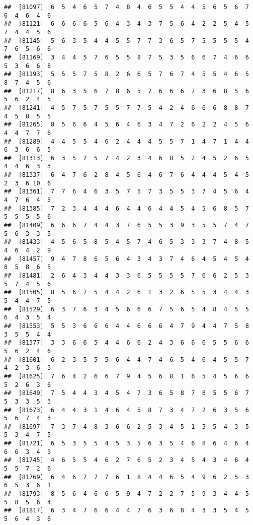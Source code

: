 \documentclass[
]{book}
\begin{document}
\begin{verbatim}
##  [81097]  6  5  4  6  5  7  4  8  4  6  5  5  4  4  5  6  5  6  7  6  4  6  4  6
##  [81121]  6  6  6  6  5  6  4  3  4  3  7  5  6  4  2  2  5  4  5  7  4  4  5  6
##  [81145]  5  6  3  5  4  4  5  5  7  7  3  6  5  7  5  5  5  5  4  7  6  5  6  6
##  [81169]  3  4  4  5  7  6  5  5  8  7  5  3  5  6  6  7  4  6  6  5  3  6  6  8
##  [81193]  5  5  5  7  5  8  2  6  6  5  7  6  7  4  5  5  4  6  5  8  7  4  5  6
##  [81217]  8  6  3  5  6  7  8  6  5  7  6  6  6  7  3  6  8  5  6  5  6  2  4  5
##  [81241]  4  5  7  5  7  5  5  7  7  5  4  2  4  6  6  6  8  8  7  4  5  8  5  5
##  [81265]  8  5  6  6  4  5  6  4  6  3  4  7  2  6  2  2  4  5  6  4  4  7  7  6
##  [81289]  4  4  5  5  4  6  2  4  4  4  5  5  7  1  4  7  1  4  4  6  3  6  6  5
##  [81313]  6  3  5  2  5  7  4  2  3  4  6  8  5  2  4  5  2  6  5  4  4  6  3  3
##  [81337]  6  4  7  6  2  8  4  5  6  4  6  7  6  4  4  4  5  4  5  2  3  6 10  6
##  [81361]  7  7  6  4  6  3  5  7  5  7  3  5  5  3  7  4  5  6  4  4  7  6  4  5
##  [81385]  7  2  3  4  4  4  6  4  4  6  4  4  5  4  5  6  8  5  7  5  5  5  5  6
##  [81409]  6  6  6  7  4  4  3  7  6  5  5  3  9  3  5  5  7  4  7  5  6  3  3  5
##  [81433]  4  5  6  5  8  5  4  5  7  4  6  5  3  3  3  7  4  8  5  4  6  4  2  9
##  [81457]  9  4  7  8  6  5  6  4  3  4  3  7  4  6  4  5  4  5  4  8  5  8  6  5
##  [81481]  2  6  4  3  4  4  3  3  6  5  5  5  5  7  6  6  2  5  3  5  7  4  5  6
##  [81505]  8  5  6  7  5  4  4  2  6  1  3  2  6  5  5  3  4  4  3  5  4  4  7  5
##  [81529]  6  3  7  6  3  4  5  6  6  6  7  5  6  5  4  8  4  5  5  6  4  3  5  4
##  [81553]  5  5  3  6  6  6  4  4  6  6  6  4  7  9  4  4  7  5  8  3  5  5  4  4
##  [81577]  3  3  6  6  5  4  4  6  6  2  4  3  6  6  6  5  5  6  6  5  6  2  4  6
##  [81601]  6  2  3  5  5  5  6  4  4  7  4  6  5  4  6  4  5  5  7  4  2  3  6  3
##  [81625]  7  6  4  2  6  6  7  9  4  5  6  8  1  6  5  4  5  6  6  5  2  6  3  6
##  [81649]  7  5  4  4  3  4  5  4  7  3  6  5  8  7  8  5  5  6  7  5  3  3  5  3
##  [81673]  6  4  4  3  1  4  6  4  5  8  7  3  4  7  2  6  3  5  6  5  6  7  4  3
##  [81697]  7  3  7  4  8  3  6  6  2  5  3  4  5  1  5  5  4  3  5  5  3  4  7  5
##  [81721]  6  5  3  5  5  4  5  3  5  6  3  5  4  6  8  6  4  6  4  6  6  3  4  3
##  [81745]  4  6  5  5  4  6  2  7  6  5  2  3  4  5  4  3  4  6  4  5  5  7  2  6
##  [81769]  6  4  6  7  7  7  6  1  8  4  4  6  5  4  9  6  2  5  3  6  5  3  6  1
##  [81793]  8  5  6  4  6  6  5  9  4  7  2  2  7  5  9  3  4  4  5  5  8  5  6  4
##  [81817]  6  3  4  7  6  6  4  4  7  6  3  6  8  4  3  3  5  4  5  5  6  4  3  6

\end{verbatim}
\end{document}
